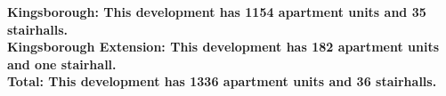 \bf{Kingsborough}: This development has 1154 apartment units and 35 stairhalls.\\\bf{Kingsborough Extension}: This development has 182 apartment units and one stairhall.\\\bf{Total}: This development has 1336 apartment units and 36 stairhalls.\\